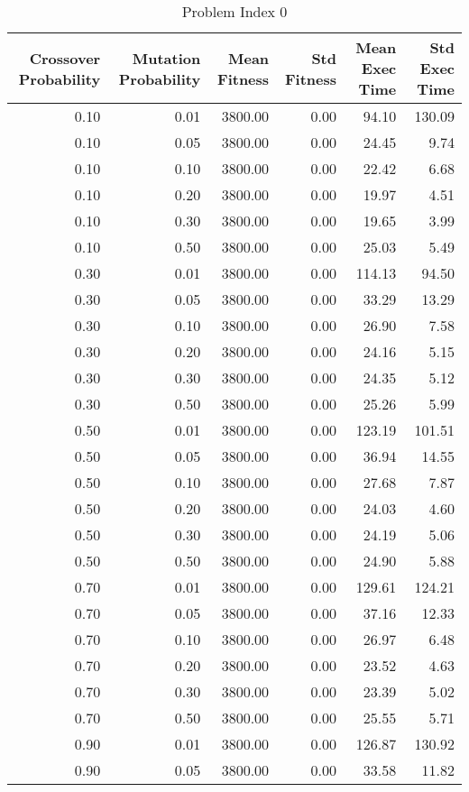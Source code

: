 \begin{table}
\caption{Problem Index 0}
\label{tab:problem_0}
\begin{tabular}{rrrrrr}
\toprule
Crossover Probability & Mutation Probability & Mean Fitness & Std Fitness & Mean Exec Time & Std Exec Time \\
\midrule
0.10 & 0.01 & 3800.00 & 0.00 & 94.10 & 130.09 \\
0.10 & 0.05 & 3800.00 & 0.00 & 24.45 & 9.74 \\
0.10 & 0.10 & 3800.00 & 0.00 & 22.42 & 6.68 \\
0.10 & 0.20 & 3800.00 & 0.00 & 19.97 & 4.51 \\
0.10 & 0.30 & 3800.00 & 0.00 & 19.65 & 3.99 \\
0.10 & 0.50 & 3800.00 & 0.00 & 25.03 & 5.49 \\
0.30 & 0.01 & 3800.00 & 0.00 & 114.13 & 94.50 \\
0.30 & 0.05 & 3800.00 & 0.00 & 33.29 & 13.29 \\
0.30 & 0.10 & 3800.00 & 0.00 & 26.90 & 7.58 \\
0.30 & 0.20 & 3800.00 & 0.00 & 24.16 & 5.15 \\
0.30 & 0.30 & 3800.00 & 0.00 & 24.35 & 5.12 \\
0.30 & 0.50 & 3800.00 & 0.00 & 25.26 & 5.99 \\
0.50 & 0.01 & 3800.00 & 0.00 & 123.19 & 101.51 \\
0.50 & 0.05 & 3800.00 & 0.00 & 36.94 & 14.55 \\
0.50 & 0.10 & 3800.00 & 0.00 & 27.68 & 7.87 \\
0.50 & 0.20 & 3800.00 & 0.00 & 24.03 & 4.60 \\
0.50 & 0.30 & 3800.00 & 0.00 & 24.19 & 5.06 \\
0.50 & 0.50 & 3800.00 & 0.00 & 24.90 & 5.88 \\
0.70 & 0.01 & 3800.00 & 0.00 & 129.61 & 124.21 \\
0.70 & 0.05 & 3800.00 & 0.00 & 37.16 & 12.33 \\
0.70 & 0.10 & 3800.00 & 0.00 & 26.97 & 6.48 \\
0.70 & 0.20 & 3800.00 & 0.00 & 23.52 & 4.63 \\
0.70 & 0.30 & 3800.00 & 0.00 & 23.39 & 5.02 \\
0.70 & 0.50 & 3800.00 & 0.00 & 25.55 & 5.71 \\
0.90 & 0.01 & 3800.00 & 0.00 & 126.87 & 130.92 \\
0.90 & 0.05 & 3800.00 & 0.00 & 33.58 & 11.82 \\

\end{tabular}
\end{table}
